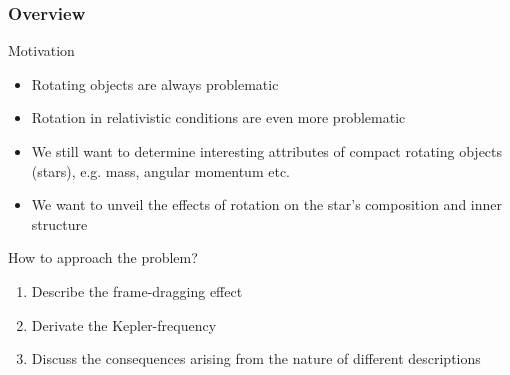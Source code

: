 \begin{frame}
\frametitle{Overview}

\begin{block}{Motivation}
	\begin{itemize}
		\item Rotating objects are always problematic
		\item Rotation in relativistic conditions are even more problematic
		\item We still want to determine interesting attributes of compact rotating objects (stars), e.g. mass, angular momentum etc.
		\item We want to unveil the effects of rotation on the star's composition and inner structure
	\end{itemize}
\end{block}

\begin{exampleblock}{How to approach the problem?}
	\begin{enumerate}
		\item Describe the frame-dragging effect
		\item Derivate the Kepler-frequency
		\item Discuss the consequences arising from the nature of different descriptions
	\end{enumerate}
\end{exampleblock}

\end{frame}